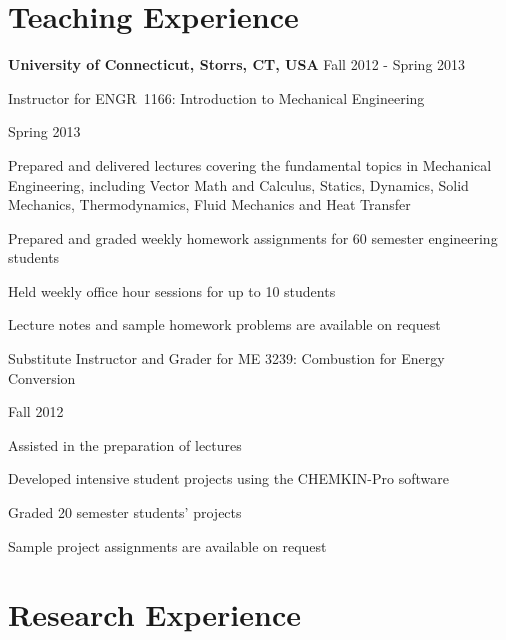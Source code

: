 \section{Teaching Experience}
\textbf{ University of Connecticut, Storrs, CT, USA} \hfill Fall 2012 - Spring 2013
\begin{outerlist}
    \item[] Instructor for ENGR~1166: Introduction to Mechanical Engineering
        \begin{innerlist}
            \item Spring 2013
            \item Prepared and delivered lectures covering the fundamental topics in Mechanical Engineering, including Vector Math and Calculus, Statics, Dynamics, Solid Mechanics, Thermodynamics, Fluid Mechanics and Heat Transfer
            \item Prepared and graded weekly homework assignments for 60  semester engineering students
            \item Held weekly office hour sessions for up to 10 students
            \item[] Lecture notes and sample homework problems are available on request
        \end{innerlist}

        \halfblankline

   \item[] Substitute Instructor and Grader for ME 3239: Combustion for Energy Conversion
        \begin{innerlist}
            \item Fall 2012
            \item Assisted in the preparation of lectures
            \item Developed intensive student projects using the CHEMKIN-Pro software
            \item Graded 20  semester students' projects
            \item[] Sample project assignments are available on request
        \end{innerlist}

\end{outerlist}


\section{Research Experience}

